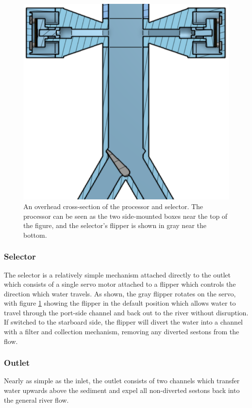 \documentclass[fleqn,10pt]{SelfArx} %
\begin{document}
	\begin{figure}[h]
		\centering
		\includegraphics[width=1\linewidth]{Figures/OverheadCrosssection}
		\caption[Selector Cross-section]{An overhead cross-section of the processor and selector. The processor can be seen as the two side-mounted boxes near the top of the figure, and the selector's flipper is shown in gray near the bottom.}
		\label{fig:OverheadCrosssec}
	\end{figure}
	
	\subsubsection{Selector}
	The selector is a relatively simple mechanism attached directly to the outlet which consists of a single servo motor attached to a flipper which controls the direction which water travels. As shown, the gray flipper rotates on the servo, with figure \ref{fig:OverheadCrosssec} showing the flipper in the default position which allows water to travel through the port-side channel and back out to the river without disruption. If switched to the starboard side, the flipper will divert the water into a channel with a filter and collection mechanism, removing any diverted sestons from the flow.
	
	\subsubsection{Outlet}
	Nearly as simple as the inlet, the outlet consists of two channels which transfer water upwards above the sediment and expel all non-diverted sestons back into the general river flow.
	
\end{document}
